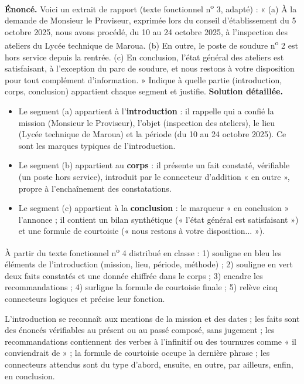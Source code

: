 \documentclass[11pt]{article}
\begin{document}
\begin{exoresolu}
\textbf{Énoncé.} Voici un extrait de rapport (texte fonctionnel n\textsuperscript{o} 3, adapté) : « (a) À la demande de Monsieur le Proviseur, exprimée lors du conseil d'établissement du 5 octobre 2025, nous avons procédé, du 10 au 24 octobre 2025, à l'inspection des ateliers du Lycée technique de Maroua. (b) En outre, le poste de soudure n\textsuperscript{o} 2 est hors service depuis la rentrée. (c) En conclusion, l'état général des ateliers est satisfaisant, à l'exception du parc de soudure, et nous restons à votre disposition pour tout complément d'information. » Indique à quelle partie (introduction, corps, conclusion) appartient chaque segment et justifie.
\tcblower
\textbf{Solution détaillée.}
\begin{itemize}
  \item Le segment (a) appartient à l'\textbf{introduction} : il rappelle qui a confié la mission (Monsieur le Proviseur), l'objet (inspection des ateliers), le lieu (Lycée technique de Maroua) et la période (du 10 au 24 octobre 2025). Ce sont les marques typiques de l'introduction.
  \item Le segment (b) appartient au \textbf{corps} : il présente un fait constaté, vérifiable (un poste hors service), introduit par le connecteur d'addition « en outre », propre à l'enchaînement des constatations.
  \item Le segment (c) appartient à la \textbf{conclusion} : le marqueur « en conclusion » l'annonce ; il contient un bilan synthétique (« l'état général est satisfaisant ») et une formule de courtoisie (« nous restons à votre disposition... »).
\end{itemize}
\end{exoresolu}

\begin{exercice}
À partir du texte fonctionnel n\textsuperscript{o} 4 distribué en classe : 1) souligne en bleu les éléments de l'introduction (mission, lieu, période, méthode) ; 2) souligne en vert deux faits constatés et une donnée chiffrée dans le corps ; 3) encadre les recommandations ; 4) surligne la formule de courtoisie finale ; 5) relève cinq connecteurs logiques et précise leur fonction.
\end{exercice}

\begin{corrige}
L'introduction se reconnaît aux mentions de la mission et des dates ; les faits sont des énoncés vérifiables au présent ou au passé composé, sans jugement ; les recommandations contiennent des verbes à l'infinitif ou des tournures comme « il conviendrait de » ; la formule de courtoisie occupe la dernière phrase ; les connecteurs attendus sont du type d'abord, ensuite, en outre, par ailleurs, enfin, en conclusion.
\end{corrige}
\end{document}
